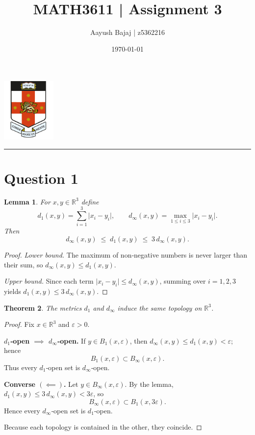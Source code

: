 \documentclass[dvipsnames,12pt]{exam}
\author{Aayush Bajaj | z5362216}
\date{\today}
\title{MATH3611 | Assignment 3}
\newcommand{\R}{{\mathbb{R}}}
\newtheorem{theorem}{Theorem}[section]
\newtheorem{lemma}[theorem]{Lemma}
\theoremstyle{definition}
\begin{document}
\maketitle
\dotfill
\tableofcontents
\vspace{1cm}
\begin{center}
\includegraphics[width=0.2\textwidth]{logo.png}
\end{center}
\vspace{1cm}
\hrule

\newpage

\section{Question 1} \label{question1}

\begin{lemma}
For $x,y\in\R^{3}$ define
\[
d_{1}(x,y)=\sum_{i=1}^{3}\lvert x_{i}-y_{i}\rvert,
\qquad
d_{\infty}(x,y)=\max_{1\le i\le 3}\lvert x_{i}-y_{i}\rvert.
\]
Then
\[
d_{\infty}(x,y)\;\le\;d_{1}(x,y)\;\le\;3\,d_{\infty}(x,y).
\]
\end{lemma}

\begin{proof}
\emph{Lower bound.}
The maximum of non‑negative numbers is never larger than their sum, so  
$d_{\infty}(x,y)\le d_{1}(x,y)$.

\emph{Upper bound.}
Since each term $\lvert x_{i}-y_{i}\rvert\le d_{\infty}(x,y)$, summing over
$i=1,2,3$ yields $d_{1}(x,y)\le 3\,d_{\infty}(x,y)$.
\end{proof}

\begin{theorem}\label{thm:topology}
The metrics $d_{1}$ and $d_{\infty}$ induce the same topology on $\R^{3}$.
\end{theorem}

\begin{proof}
Fix $x\in\R^{3}$ and $\varepsilon>0$.

\smallskip
\textbf{$d_{1}$‑open $\implies$ $d_{\infty}$‑open.}
If $y\in B_{1}(x,\varepsilon)$, then
$d_{\infty}(x,y)\le d_{1}(x,y)<\varepsilon$; hence
\[
B_{1}(x,\varepsilon)\subset B_{\infty}(x,\varepsilon).
\]
Thus every $d_{1}$‑open set is $d_{\infty}$‑open.

\smallskip
\textbf{Converse $(\impliedby)$.}
Let $y\in B_{\infty}(x,\varepsilon)$.  
By the lemma, $d_{1}(x,y)\le 3\,d_{\infty}(x,y)<3\varepsilon$, so
\[
B_{\infty}(x,\varepsilon)\subset B_{1}(x,3\varepsilon).
\]
Hence every $d_{\infty}$‑open set is $d_{1}$‑open.

\smallskip
Because each topology is contained in the other, they coincide.
\end{proof}
\end{document}
